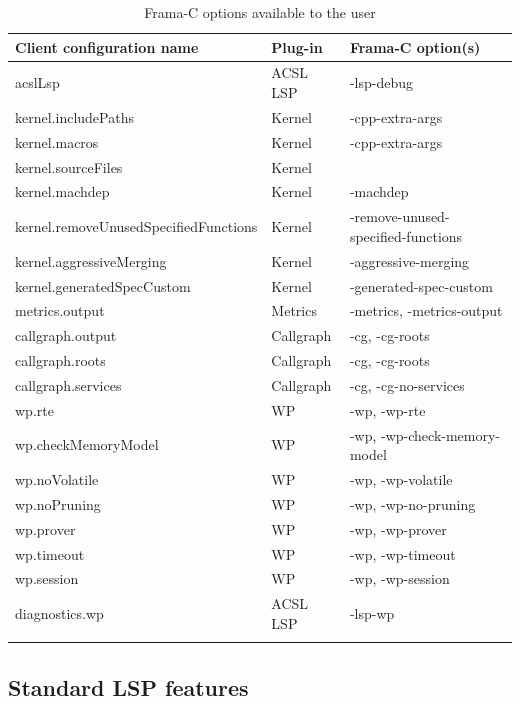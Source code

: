 \documentclass[10pt]{article}
\begin{document}
\begin{singlespace}
\begin{longtable}[H]{|l|l|l|}
	\hline
	\textbf{Client configuration name} &
	\textbf{Plug-in} &
	\textbf{Frama-C option(s)} \\ \hline
	acslLsp 						& ACSL LSP    & -lsp-debug	\\ \hline
	kernel.includePaths 					& Kernel    & -cpp-extra-args \\ \hline
	kernel.macros 							& Kernel    & -cpp-extra-args \\ \hline
	kernel.sourceFiles 					& Kernel    &  \\ \hline
	kernel.machdep 						& Kernel    & -machdep \\ \hline
	kernel.removeUnusedSpecifiedFunctions 	& Kernel    & -remove-unused-specified-functions \\ \hline
	kernel.aggressiveMerging 				& Kernel    & -aggressive-merging \\ \hline
	kernel.generatedSpecCustom 			& Kernel    & -generated-spec-custom \\ \hline
	metrics.output 					& Metrics   & -metrics, -metrics-output \\ \hline
	callgraph.output 							& Callgraph & -cg, -cg-roots \\ \hline
	callgraph.roots 							& Callgraph & -cg, -cg-roots \\ \hline
	callgraph.services 					& Callgraph & -cg, -cg-no-services \\ \hline
	wp.rte 							& WP & -wp, -wp-rte \\ \hline
	wp.checkMemoryModel 			& WP & -wp, -wp-check-memory-model \\ \hline
	wp.noVolatile 					& WP & -wp, -wp-volatile \\ \hline
	wp.noPruning 					& WP & -wp, -wp-no-pruning \\ \hline
	wp.prover 						& WP & -wp, -wp-prover \\ \hline
	wp.timeout 						& WP & -wp, -wp-timeout \\ \hline
	wp.session 						& WP & -wp, -wp-session \\ \hline
	diagnostics.wp 					& ACSL LSP & -lsp-wp \\ \hline
	\caption{Frama-C options available to the user}
	\label{tab:features-options}
\end{longtable}

\subsection{Standard LSP features}

\end{singlespace}
\end{document}
